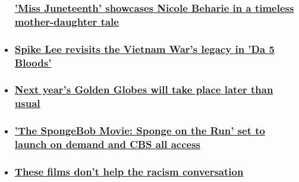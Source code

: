 \begin{itemize}
{  \subsubsection{\texorpdfstring{\href{/2020/06/19/entertainment/miss-juneteenth/index.html}{'Miss
  Juneteenth' showcases Nicole Beharie in a timeless mother-daughter
  tale}}{'Miss Juneteenth' showcases Nicole Beharie in a timeless mother-daughter tale}}\label{miss-juneteenth-showcases-nicole-beharie-in-a-timeless-mother-daughter-tale}}
\item
  \hypertarget{spike-lee-revisits-the-vietnam-wars-legacy-in-da-5-bloods}{%
  \subsubsection{\texorpdfstring{\href{/2020/06/10/entertainment/da-5-bloods-review/index.html}{Spike
  Lee revisits the Vietnam War's legacy in 'Da 5
  Bloods'}}{Spike Lee revisits the Vietnam War's legacy in 'Da 5 Bloods'}}\label{spike-lee-revisits-the-vietnam-wars-legacy-in-da-5-bloods}}
\item
  \hypertarget{next-years-golden-globes-will-take-place-later-than-usual}{%
  \subsubsection{\texorpdfstring{\href{/2020/06/22/entertainment/golden-globes/index.html}{Next
  year's Golden Globes will take place later than
  usual}}{Next year's Golden Globes will take place later than usual}}\label{next-years-golden-globes-will-take-place-later-than-usual}}
\item
  \hypertarget{the-spongebob-movie-sponge-on-the-run-set-to-launch-on-demand-and-cbs-all-access-}{%
  \subsubsection{\texorpdfstring{\href{/2020/06/23/entertainment/spongebob-movie-stream/index.html}{'The
  SpongeBob Movie: Sponge on the Run' set to launch on demand and CBS
  all access
  }}{'The SpongeBob Movie: Sponge on the Run' set to launch on demand and CBS all access }}\label{the-spongebob-movie-sponge-on-the-run-set-to-launch-on-demand-and-cbs-all-access-}}
\item
  \hypertarget{these-films-dont-help-the-racism-conversation}{%
  \subsubsection{\texorpdfstring{\href{/2020/06/10/entertainment/racism-movies-conversation/index.html}{These
  films don't help the racism
  conversation}}{These films don't help the racism conversation}}\label{these-films-dont-help-the-racism-conversation}}
\end{itemize}

